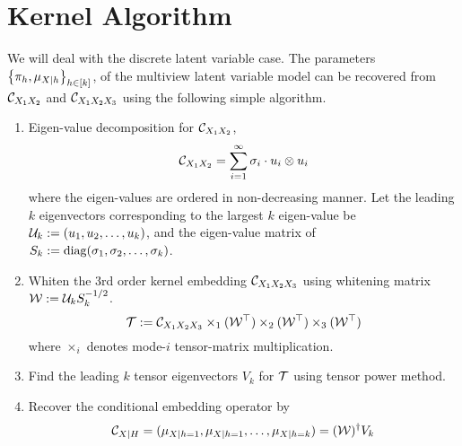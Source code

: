 \documentclass{article}
\begin{document}


\section{Kernel Algorithm}

We will deal with the discrete latent variable case.
The parameters $\left\{\pi_h, \mu_{X|h}\right\}_{h \in [k]}$, of the multiview latent variable model can be recovered from $\mathcal{C}_{X_1 X_2}$ and $\mathcal{C}_{X_1 X_2 X_3}$ using the following simple algorithm.
\begin{enumerate}
  \item Eigen-value decomposition for $\mathcal{C}_{X_1 X_2}$,
    $$\mathcal{C}_{X_1 X_2} = \sum_{i=1}^{\infty} \sigma_i \cdot u_i \otimes u_i$$
    where the eigen-values are ordered in non-decreasing manner. Let the leading $k$ eigenvectors corresponding to the largest $k$ eigen-value be  $\mathcal{U}_k:=(u_1,u_2,\ldots,u_k)$, and the eigen-value matrix of $S_k:=\mathop{\mathrm{diag}}(\sigma_1,\sigma_2,\ldots,\sigma_k)$.
  \item Whiten the 3rd order kernel embedding $\mathcal{C}_{X_1 X_2 X_3}$ using whitening matrix $\mathcal{W}:= \mathcal{U}_k S_k^{-1/2}$.
    $${\mathcal{T}} := \mathcal{C}_{X_1 X_2 X_3} \times_1 (\mathcal{W}^\top) \times_2 (\mathcal{W}^\top) \times_3 (\mathcal{W}^\top)$$
    where $\times_i$ denotes mode-$i$ tensor-matrix multiplication.
  \item Find the leading $k$ tensor eigenvectors $V_k$ for ${\mathcal{T}}$ using tensor power method.
  \item Recover the conditional embedding operator by
    $$ \mathcal{C}_{X|H} = (\mu_{X|h=1},\mu_{X|h=1},\ldots,\mu_{X|h=k}) = (\mathcal{W})^\dagger V_k $$
\end{enumerate}
\end{document}
